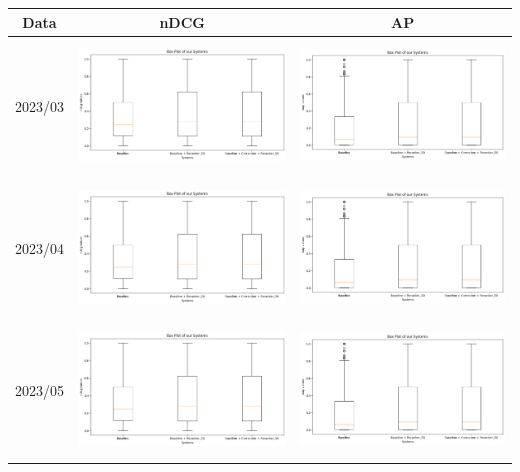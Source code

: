 \begin{tabular}{|c|c|c|}
\hline
\textbf{Data} & \textbf{nDCG} & \textbf{AP} \\
\hline
2023/03 & \includegraphics[height=3.5cm]{figure/box_ndcg_3.png} & \includegraphics[height=3.5cm]{figure/box_ap_3.png} \\
2023/04 & \includegraphics[height=3.5cm]{figure/box_ndcg_3.png} & \includegraphics[height=3.5cm]{figure/box_ap_3.png} \\
2023/05 & \includegraphics[height=3.5cm]{figure/box_ndcg_3.png} & \includegraphics[height=3.5cm]{figure/box_ap_3.png} \\

\end{tabular}
